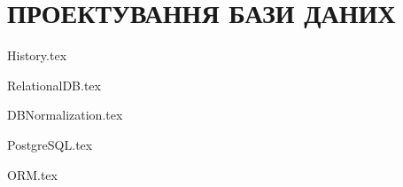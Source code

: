 \section{ПРОЕКТУВАННЯ БАЗИ ДАНИХ}

{History.tex}

{RelationalDB.tex}

{DBNormalization.tex}

{PostgreSQL.tex}

{ORM.tex}




